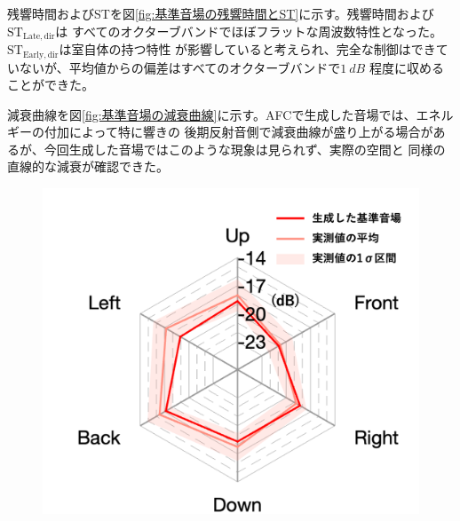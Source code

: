 \documentclass[11pt,a4j]{jreport}
\begin{document}
  残響時間およびSTを図\ref{fig:基準音場の残響時間とST}に示す。残響時間および$\mathrm{ST_{Late,dir}}$は
  すべてのオクターブバンドでほぼフラットな周波数特性となった。$\mathrm{ST_{Early,dir}}$は室自体の持つ特性
  が影響していると考えられ、完全な制御はできていないが、平均値からの偏差はすべてのオクターブバンドで$\SI{1}{dB}$
  程度に収めることができた。
  
  減衰曲線を図\ref{fig:基準音場の減衰曲線}に示す。AFCで生成した音場では、エネルギーの付加によって特に響きの
  後期反射音側で減衰曲線が盛り上がる場合があるが、今回生成した音場ではこのような現象は見られず、実際の空間と
  同様の直線的な減衰が確認できた。

  \begin{figure}[H]
    \begin{minipage}
      [b]{.5\linewidth}
      \centering
      \includegraphics[width=1\linewidth]{images/experimentField/withLegend/baseEarlyOnTarget4.png}
    \end{minipage}%
    \begin{minipage}
      [b]{.5\linewidth}
      \centering

\end{minipage}
\end{figure}
\end{document}
